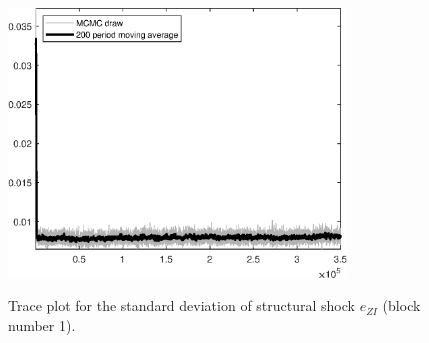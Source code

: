 \begin{figure}[H]
\centering
  \includegraphics[width=0.8\textwidth]{BRS_growth_id/graphs/TracePlot_SE_e_ZI_blck_1}\\
    \caption{Trace plot for the standard deviation of structural shock ${e_{ZI}}$ (block number 1).}
\end{figure}
